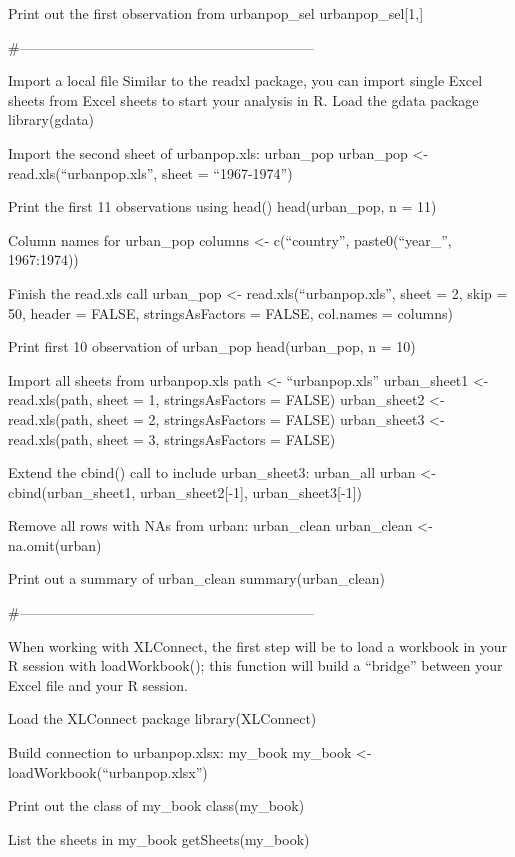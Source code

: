 \documentclass[]{book}
\begin{document}
Print out the first observation from urbanpop\_sel
urbanpop\_sel{[}1,{]}

\#---------------------------------------------------------------

Import a local file
Similar to the readxl package, you can import single Excel sheets from Excel sheets to start your analysis in R.
Load the gdata package
library(gdata)

Import the second sheet of urbanpop.xls: urban\_pop
urban\_pop \textless{}- read.xls(``urbanpop.xls'', sheet = ``1967-1974'')

Print the first 11 observations using head()
head(urban\_pop, n = 11)

Column names for urban\_pop
columns \textless{}- c(``country'', paste0(``year\_'', 1967:1974))

Finish the read.xls call
urban\_pop \textless{}- read.xls(``urbanpop.xls'', sheet = 2,
skip = 50, header = FALSE, stringsAsFactors = FALSE,
col.names = columns)

Print first 10 observation of urban\_pop
head(urban\_pop, n = 10)

Import all sheets from urbanpop.xls
path \textless{}- ``urbanpop.xls''
urban\_sheet1 \textless{}- read.xls(path, sheet = 1, stringsAsFactors = FALSE)
urban\_sheet2 \textless{}- read.xls(path, sheet = 2, stringsAsFactors = FALSE)
urban\_sheet3 \textless{}- read.xls(path, sheet = 3, stringsAsFactors = FALSE)

Extend the cbind() call to include urban\_sheet3: urban\_all
urban \textless{}- cbind(urban\_sheet1, urban\_sheet2{[}-1{]}, urban\_sheet3{[}-1{]})

Remove all rows with NAs from urban: urban\_clean
urban\_clean \textless{}- na.omit(urban)

Print out a summary of urban\_clean
summary(urban\_clean)

\#---------------------------------------------------------------

When working with XLConnect, the first step will be to load a workbook in your R session with loadWorkbook(); this function will build a ``bridge'' between your Excel file and your R session.

Load the XLConnect package
library(XLConnect)

Build connection to urbanpop.xlsx: my\_book
my\_book \textless{}- loadWorkbook(``urbanpop.xlsx'')

Print out the class of my\_book
class(my\_book)

List the sheets in my\_book
getSheets(my\_book)
\end{document}
